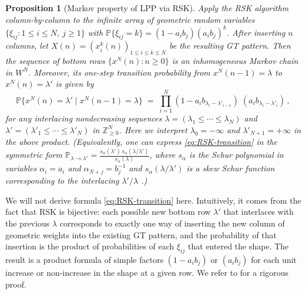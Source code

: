 \documentclass[letterpaper,11pt,oneside,reqno]{article}
\numberwithin{equation}{section}
\newtheorem{proposition}{Proposition}[section]
\theoremstyle{definition}
\begin{document}
\begin{proposition}[Markov property of LPP via RSK]\label{prop:RSK-Markov}
Apply the RSK algorithm column-by-column to the infinite array of geometric random variables $\{\xi_{ij}: 1\le i\le N,\ j\ge1\}$ with $\mathbb{P}\{\xi_{ij}=k\} = (1-a_i b_j) (a_i b_j)^k$. After inserting $n$ columns, let $X(n) = (x_i^k(n))_{1\le i\le k\le N}$ be the resulting GT pattern. Then the sequence of bottom rows $\{x^N(n): n\ge0\}$ is an inhomogeneous Markov chain in $W^N$. Moreover, its one-step transition probability from $x^{N}(n-1)=\lambda$ to $x^N(n)=\lambda'$ is given by
\begin{equation}\label{eq:RSK-transition}
\mathbb{P}\{x^N(n) = \lambda' \mid x^N(n-1)=\lambda\} \;=\; \prod_{i=1}^N (1 - a_i b_{\lambda_i - \lambda'_{i-1}})\; (a_i b_{\lambda_i - \lambda'_i})\,,
\end{equation}
for any interlacing nondecreasing sequences $\lambda=(\lambda_1\le \cdots\le \lambda_N)$ and $\lambda'=(\lambda'_1\le \cdots\le \lambda'_N)$ in $\mathbb{Z}_{\ge0}^N$. Here we interpret $\lambda_0= -\infty$ and $\lambda'_{N+1}=+\infty$ in the above product. (Equivalently, one can express \eqref{eq:RSK-transition} in the symmetric form $\displaystyle \mathbb{P}_{\lambda\to\lambda'} = \frac{s_\alpha(\lambda')\, s_\alpha(\lambda/\lambda')}{s_\alpha(\lambda)}$, where $s_\alpha$ is the Schur polynomial in variables $\alpha_i = a_i$ and $\alpha_{N+j}=b_j^{-1}$ and $s_\alpha(\lambda/\lambda')$ is a skew Schur function corresponding to the interlacing $\lambda'/\lambda$ \cite{OConnell2003}.)
\end{proposition}

We will not derive formula \eqref{eq:RSK-transition} here. Intuitively, it comes from the fact that RSK is bijective: each possible new bottom row $\lambda'$ that interlaces with the previous $\lambda$ corresponds to exactly one way of inserting the new column of geometric weights into the existing GT pattern, and the probability of that insertion is the product of probabilities of each $\xi_{ij}$ that entered the shape. The result is a product formula of simple factors $(1- a_i b_j)$ or $(a_i b_j)$ for each unit increase or non-increase in the shape at a given row. We refer to \cite{OConnell2003} for a rigorous proof.
\end{document}
